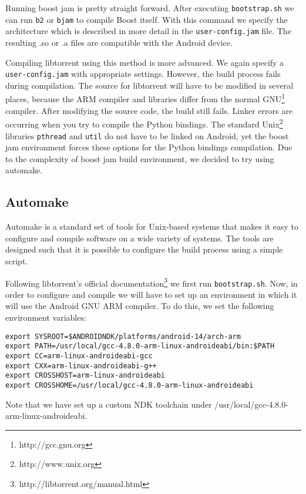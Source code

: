 		Running boost jam is pretty straight forward. After executing \texttt{bootstrap.sh} we can run \texttt{b2} or \texttt{bjam} to compile Boost itself. With this command we specify the architecture which is described in more detail in the \texttt{user-config.jam} file. The resulting .so or .a files are compatible with the Android device.
		
		Compiling libtorrent using this method is more advanced. We again specify a \texttt{user-config.jam} with appropriate settings. However, the build process fails during compilation. The source for libtorrent will have to be modified in several places, because the ARM compiler and libraries differ from the normal GNU\footnote{http://gcc.gnu.org} compiler. After modifying the source code, the build still fails. Linker errors are occurring when you try to compile the Python bindings. The standard Unix\footnote{http://www.unix.org} libraries \texttt{pthread} and \texttt{util} do not have to be linked on Android, yet the boost jam environment forces these options for the Python bindings compilation. Due to the complexity of boost jam build environment, we decided to try using automake.
		
		\subsection{Automake}
		Automake is a standard set of tools for Unix-based systems that makes it easy to configure and compile software on a wide variety of systems. The tools are designed such that it is possible to configure the build process using a simple script.
		
		Following libtorrent's official documentation\footnote{http://libtorrent.org/manual.html} we first run \texttt{bootstrap.sh}. Now, in order to configure and compile we will have to set up an environment in which it will use the Android GNU ARM compiler. To do this, we set the following environment variables:
		
		\begin{lstlisting}
export SYSROOT=$ANDROIDNDK/platforms/android-14/arch-arm
export PATH=/usr/local/gcc-4.8.0-arm-linux-androideabi/bin:$PATH
export CC=arm-linux-androideabi-gcc
export CXX=arm-linux-androideabi-g++
export CROSSHOST=arm-linux-androideabi
export CROSSHOME=/usr/local/gcc-4.8.0-arm-linux-androideabi
		\end{lstlisting}
		
		Note that we have set up a custom NDK toolchain under /usr/local/gcc-4.8.0-arm-linux-androideabi. 
		

